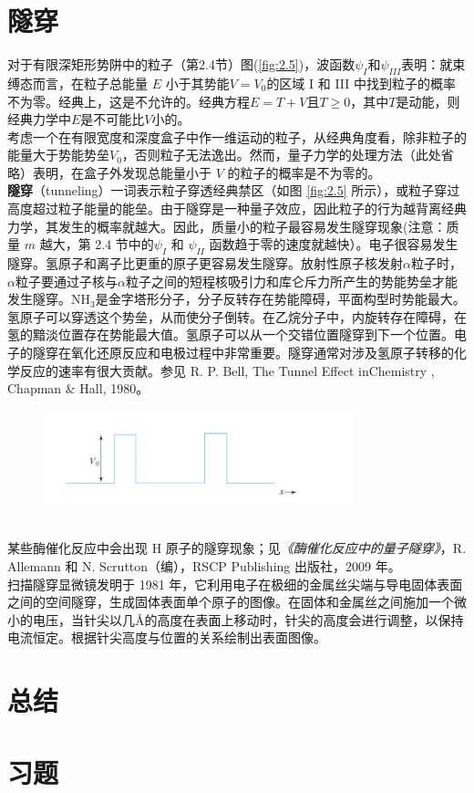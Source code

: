 \section{隧穿}
\label{sec:2.5 Tunneling}
	对于有限深矩形势阱中的粒子（第2.4节）图(\ref{fig:2.5})，波函数$\psi_I$和$\psi_{III}$表明：就束缚态而言，在粒子总能量 $E$ 小于其势能$V=V_0$的区域 I 和 III 中找到粒子的概率不为零。经典上，这是不允许的。经典方程$E=T+V$且$T \ge 0$，其中$T$是动能，则经典力学中$E$是不可能比$V$小的。\\
	\indent 考虑一个在有限宽度和深度盒子中作一维运动的粒子，从经典角度看，除非粒子的能量大于势能势垒$V_0$，否则粒子无法逸出。然而，量子力学的处理方法（此处省略）表明，在盒子外发现总能量小于 $V$ 的粒子的概率是不为零的。\\
	\indent \textbf{隧穿}（tunneling）一词表示粒子穿透经典禁区（如图 \ref{fig:2.5} 所示），或粒子穿过高度超过粒子能量的能垒。由于隧穿是一种量子效应，因此粒子的行为越背离经典力学，其发生的概率就越大。因此，质量小的粒子最容易发生隧穿现象(注意：质量 $m$ 越大，第 2.4 节中的$\psi_I$ 和 $\psi_{II}$ 函数趋于零的速度就越快）。电子很容易发生隧穿。氢原子和离子比更重的原子更容易发生隧穿。放射性原子核发射$\alpha$粒子时，$\alpha$粒子要通过子核与$\alpha$粒子之间的短程核吸引力和库仑斥力所产生的势能势垒才能发生隧穿。$\mathrm{NH_3}$是金字塔形分子，分子反转存在势能障碍，平面构型时势能最大。氢原子可以穿透这个势垒，从而使分子倒转。在乙烷分子中，内旋转存在障碍，在氢的黯淡位置存在势能最大值。氢原子可以从一个交错位置隧穿到下一个位置。电子的隧穿在氧化还原反应和电极过程中非常重要。隧穿通常对涉及氢原子转移的化学反应的速率有很大贡献。参见 R. P. Bell, The Tunnel Effect inChemistry , Chapman $\&$ Hall, 1980。
		\begin{figure}[h!]
		\centering
		\includegraphics[width=0.8\textwidth]{Figures/2.6.png}  %
		\caption{}
		\label{fig:2.6}
	\end{figure}
	\\
	\indent 某些酶催化反应中会出现 H 原子的隧穿现象；见\textit{《酶催化反应中的量子隧穿》}，R. Allemann 和 N. Scrutton（编），RSCP Publishing 出版社，2009 年。\\
	\indent  扫描隧穿显微镜发明于 1981 年，它利用电子在极细的金属丝尖端与导电固体表面之间的空间隧穿，生成固体表面单个原子的图像。在固体和金属丝之间施加一个微小的电压，当针尖以几\AA 的高度在表面上移动时，针尖的高度会进行调整，以保持电流恒定。根据针尖高度与位置的关系绘制出表面图像。
	
	
	
	
	
	
	

\section*{总结}

\section*{习题}
